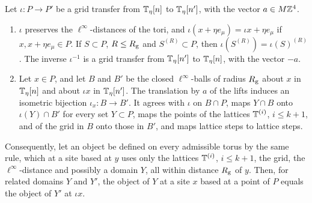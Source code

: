 \begin{lemma}\label{lem:grid-transfer}
Let $\iota:P\to P'$ be a grid transfer from $\mathbb T_\eta[n]$ to $\mathbb T_\eta[n']$, with the vector $a\in M\mathbb Z^4$.
\begin{enumerate}[label=(\alph*)]
\item $\iota$ preserves the $\ell^\infty$-distances of the tori, and $\iota(x+\eta e_\mu)=\iota x+\eta e_\mu$ if $x,x+\eta e_\mu\in P$. If $S\subset P$, $R\le R_{\rm g}$ and $S^{(R)}\subset P$, then $\iota(S^{(R)})=\iota(S)^{(R)}$. The inverse $\iota^{-1}$ is a grid transfer from $\mathbb T_\eta[n']$ to $\mathbb T_\eta[n]$, with the vector $-a$.
\item Let $x\in P$, and let $B$ and $B'$ be the closed $\ell^\infty$-balls of radius $R_{\rm g}$ about $x$ in $\mathbb T_\eta[n]$ and about $\iota x$ in $\mathbb T_\eta[n']$. The translation by $a$ of the lifts induces an isometric bijection $\iota_x:B\to B'$. It agrees with $\iota$ on $B\cap P$, maps $Y\cap B$ onto $\iota(Y)\cap B'$ for every set $Y\subset P$, maps the points of the lattices $\mathbb T^{(i)}$, $i\le k+1$, and of the grid in $B$ onto those in $B'$, and maps lattice steps to lattice steps.
\end{enumerate}
Consequently, let an object be defined on every admissible torus by the same rule, which at a site based at $y$ uses only the lattices $\mathbb T^{(i)}$, $i\le k+1$, the grid, the $\ell^\infty$-distance and possibly a domain $Y$, all within distance $R_{\rm g}$ of $y$. Then, for related domains $Y$ and $Y'$, the object of $Y$ at a site $x$ based at a point of $P$ equals the object of $Y'$ at $\iota x$.
\end{lemma}

